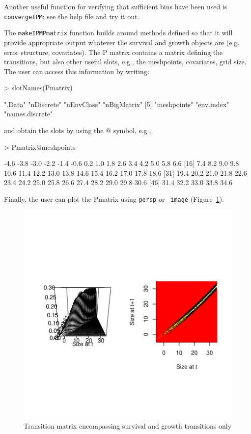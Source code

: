 \documentclass{article}
\begin{document}
Another useful function for verifying that sufficient bins have been used
is {\tt convergeIPM}; see the help file and try it out.

The {\tt makeIPMPmatrix} function builds around methods defined so that it
will provide appropriate output whatever the survival and growth objects are
(e.g. error structure, covariates). The P matrix contains a matrix defining the
transitions, but also other useful slots, e.g., the meshpoints, covariates,
grid size. The user can access this information by writing:
\begin{Schunk}
\begin{Sinput}
> slotNames(Pmatrix)
\end{Sinput}
\begin{Soutput}
[1] ".Data"          "nDiscrete"      "nEnvClass"      "nBigMatrix"    
[5] "meshpoints"     "env.index"      "names.discrete"
\end{Soutput}
\end{Schunk}
and obtain the slots by using the $@$ symbol, e.g., 
\begin{Schunk}
\begin{Sinput}
> Pmatrix@meshpoints
\end{Sinput}
\begin{Soutput}
 [1] -4.6 -3.8 -3.0 -2.2 -1.4 -0.6  0.2  1.0  1.8  2.6  3.4  4.2  5.0  5.8  6.6
[16]  7.4  8.2  9.0  9.8 10.6 11.4 12.2 13.0 13.8 14.6 15.4 16.2 17.0 17.8 18.6
[31] 19.4 20.2 21.0 21.8 22.6 23.4 24.2 25.0 25.8 26.6 27.4 28.2 29.0 29.8 30.6
[46] 31.4 32.2 33.0 33.8 34.6
\end{Soutput}
\end{Schunk}
Finally, the user can plot the Pmatrix using {\tt persp} or {\tt
  image} (Figure~\ref{fig:two}). 
\begin{figure}
\begin{center}
\includegraphics{IPMpack_Vignette-fig2}
\end{center}
\caption{Transition matrix encompassing survival and growth transitions only}
\label{fig:two}
\end{figure}
\end{document}
